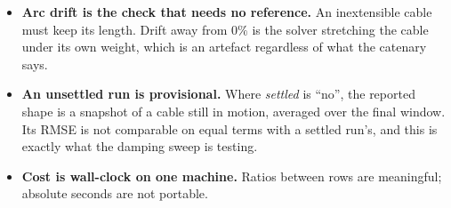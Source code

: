 \documentclass[11pt,a4paper]{article}
\begin{document}
\begin{itemize}
  \item \textbf{Arc drift is the check that needs no reference.} An
        inextensible cable must keep its length. Drift away from
        $0\%$ is the solver stretching the cable under its own weight, which is
        an artefact regardless of what the catenary says.
  \item \textbf{An unsettled run is provisional.} Where \emph{settled} is
        ``no'', the reported shape is a snapshot of a cable still in motion,
        averaged over the final window. Its RMSE is not comparable on equal
        terms with a settled run's, and this is exactly what the damping sweep
        is testing.
  \item \textbf{Cost is wall-clock on one machine.} Ratios between rows are
        meaningful; absolute seconds are not portable.
\end{itemize}
\end{document}
